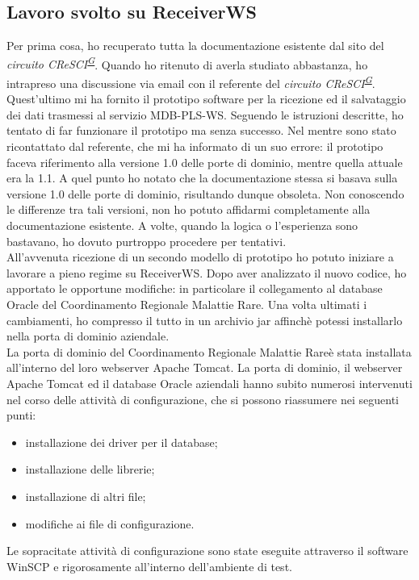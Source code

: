 \documentclass[a4paper]{article}
\newcommand{\crmr}{Coordinamento Regionale Malattie Rare}
\begin{document}
\subsection{Lavoro svolto su ReceiverWS}
Per prima cosa, ho recuperato tutta la documentazione esistente dal sito del \textit{circuito CReSCI\textsuperscript{\hyperref[sec:gl]{G}}}. Quando ho ritenuto di averla studiato abbastanza, ho intrapreso una discussione via email con il referente del \textit{circuito CReSCI\textsuperscript{\hyperref[sec:gl]{G}}}. Quest'ultimo mi ha fornito il prototipo software per la ricezione ed il salvataggio dei dati trasmessi al servizio MDB-PLS-WS. Seguendo le istruzioni descritte, ho tentato di far funzionare il prototipo ma senza successo. Nel mentre sono stato ricontattato dal referente, che mi ha informato di un suo errore: il prototipo faceva riferimento alla versione 1.0 delle porte di dominio, mentre quella attuale era la 1.1. A quel punto ho notato che la documentazione stessa si basava sulla versione 1.0 delle porte di dominio, risultando dunque obsoleta. Non conoscendo le differenze tra tali versioni, non ho potuto affidarmi completamente alla documentazione esistente. A volte, quando la logica o l'esperienza sono bastavano, ho dovuto purtroppo procedere per tentativi.
\\
All'avvenuta ricezione di un secondo modello di prototipo ho potuto iniziare a lavorare a pieno regime su ReceiverWS. Dopo aver analizzato il nuovo codice, ho apportato le opportune modifiche: in particolare il collegamento al database Oracle del \crmr. Una volta ultimati i cambiamenti, ho compresso il tutto in un archivio jar affinchè potessi installarlo nella porta di dominio aziendale.
\\
La porta di dominio del \crmr è stata installata all'interno del loro webserver Apache Tomcat. La porta di dominio, il webserver Apache Tomcat ed il database Oracle aziendali hanno subito numerosi intervenuti nel corso delle attività di configurazione, che si possono riassumere nei seguenti punti:
\begin{itemize}
	\item installazione dei driver per il database;
	\item installazione delle librerie;
    \item installazione di altri file;
    \item modifiche ai file di configurazione.
\end{itemize}
Le sopracitate attività di configurazione sono state eseguite attraverso il software WinSCP e rigorosamente all'interno dell'ambiente di test.
\end{document}
